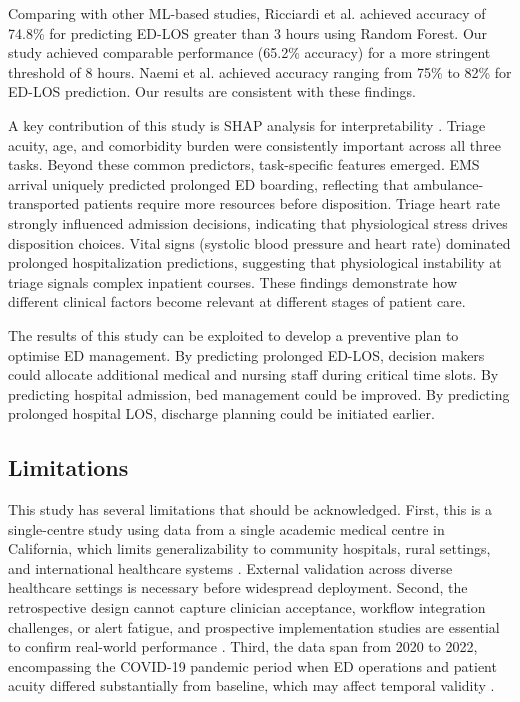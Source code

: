 \documentclass[harvard,article]{frontiersinFPHY_FAMS}
\begin{document}
Comparing with other ML-based studies, Ricciardi et al. \cite{ricciardi2024} achieved accuracy of 74.8\% for predicting ED-LOS greater than 3 hours using Random Forest. Our study achieved comparable performance (65.2\% accuracy) for a more stringent threshold of 8 hours. Naemi et al. \cite{naemi2021} achieved accuracy ranging from 75\% to 82\% for ED-LOS prediction. Our results are consistent with these findings.

A key contribution of this study is SHAP analysis for interpretability \cite{slack2022, wang2025}. Triage acuity, age, and comorbidity burden were consistently important across all three tasks. Beyond these common predictors, task-specific features emerged. EMS arrival uniquely predicted prolonged ED boarding, reflecting that ambulance-transported patients require more resources before disposition. Triage heart rate strongly influenced admission decisions, indicating that physiological stress drives disposition choices. Vital signs (systolic blood pressure and heart rate) dominated prolonged hospitalization predictions, suggesting that physiological instability at triage signals complex inpatient courses. These findings demonstrate how different clinical factors become relevant at different stages of patient care.

The results of this study can be exploited to develop a preventive plan to optimise ED management. By predicting prolonged ED-LOS, decision makers could allocate additional medical and nursing staff during critical time slots. By predicting hospital admission, bed management could be improved. By predicting prolonged hospital LOS, discharge planning could be initiated earlier.

\subsection{Limitations}

This study has several limitations that should be acknowledged. First, this is a single-centre study using data from a single academic medical centre in California, which limits generalizability to community hospitals, rural settings, and international healthcare systems \cite{wong2025, cardosi2021}. External validation across diverse healthcare settings is necessary before widespread deployment. Second, the retrospective design cannot capture clinician acceptance, workflow integration challenges, or alert fatigue, and prospective implementation studies are essential to confirm real-world performance \cite{hosseini2026, raff2024}. Third, the data span from 2020 to 2022, encompassing the COVID-19 pandemic period when ED operations and patient acuity differed substantially from baseline, which may affect temporal validity \cite{kansal2025}.
\end{document}
